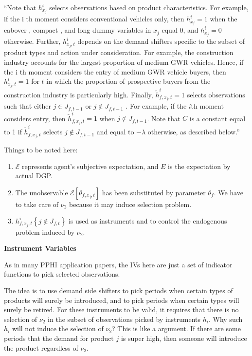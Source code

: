 \documentclass{book}
\theoremstyle{plain}
\theoremstyle{definition}
\newcommand{\mytitle}[1]{{\large{\textbf{#1}}}}
\begin{document}
``Note that $h^i_{x_j}$ selects observations based on product characteristics. For example, if the i th moment considers conventional vehicles only, then $h^i_{x_j}=1$  when the cabover , compact , and long dummy variables in $x_j$ equal 0, and $h^i_{x_j}=0$ otherwise. 
Further, $h^i_{x_j,t}$  depends on the demand shifters specific to the subset of product types and action under consideration. For example, the construction industry accounts for the largest proportion of medium GWR vehicles. Hence, if the i th moment considers the entry of medium GWR vehicle buyers, then $h^i_{x_j,t}=1$ for $t$ in which the proportion of prospective buyers from the construction industry is particularly high. 
Finally, $\tilde h^i_{f,x_j,t}=1$ selects observations such that either $j \in J _ { f , t - 1 }$ or 
$j \notin J_{f, t-1}$ . For example, if the $i$th moment considers entry, then $\tilde h^i_{f,x_j,t}=1$ when $j \notin J_{f,t-1}$. 
Note that $C$ is a constant equal to 1 if $\tilde h^i_{f,x_j,t}$ selects $j \notin J_{f,t-1}$ and equal to $- \lambda$ otherwise, as described below.''

Things to be noted here:
\begin{enumerate}
	\item $\mathcal E$ represents agent's subjective expectation, and $E$ is the expectation by actual DGP.
	\item The unobservable $\mathcal E[\theta_{f,x_j,t}]$ has been substituted by parameter $\theta_f$. We have to take care of $\nu_2$ because it may induce selection problem.
	\item $h_{f, x_{j}, t}^{i}\left\{j \notin J_{f, t}\right\}$ is used as instruments and to control the endogenous problem induced by $\nu_2$.
\end{enumerate}


\mytitle{Instrument Variables}

As in many PPHI application papers, the IVs here are just a set of indicator functions to pick selected observations.

The idea is to use demand side shifters to pick periods when certain types of products will surely be introduced, and to pick periods when certain types will surely be retired.
For these instruments to be valid, it requires that there is no selection of $\nu_2$ in the subset of observations picked by instruments $h_i$.
Why such $h_i$ will not induce the selection of $\nu_2$?
This is like a \cite{Tamer:2003hi} argument. 
If there are some periods that the demand for product $j$ is super high, then someone will introduce the product regardless of $\nu_2$.
\end{document}
